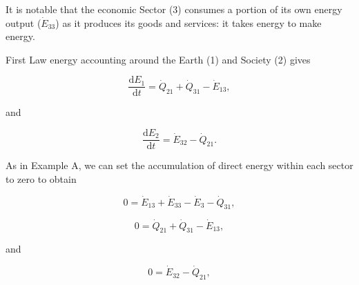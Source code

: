 \documentclass[authoryear,preprint,review,12pt]{elsarticle}
\begin{document}
\noindent It is notable that the economic Sector (3) consumes a portion of its own energy output ($\dot{E}_{33}$) as it produces its goods and services: it takes energy to make energy.

First Law energy accounting around the Earth (1) and Society (2) gives

\begin{equation} \label{eq:CV_E_dot_1}
	\frac{\mathrm{d}E_{1}}{\mathrm{d}t} 	 =  \dot{Q}_{21} + \dot{Q}_{31} - \dot{E}_{13},
\end{equation}

\noindent and 

\begin{equation} \label{eq:CV_E_dot_2}
	\frac{\mathrm{d}E_{2}}{\mathrm{d}t} 	 = \dot{E}_{32} - \dot{Q}_{21}.
\end{equation}

As in Example A, we can set the accumulation of direct energy within each sector to zero to obtain

\begin{equation} \label{eq:CV_E_dot_3_SS}
	0 =\dot{E}_{13} + \dot{E}_{33} - \dot{E}_{3} - \dot{Q}_{31},
\end{equation}

\begin{equation} \label{eq:CV_E_dot_1_SS}
	0 =  \dot{Q}_{21} + \dot{Q}_{31} - \dot{E}_{13},
\end{equation}

\noindent and 

\begin{equation} \label{eq:CV_E_dot_2_SS}
	0 =\dot{E}_{32} - \dot{Q}_{21},
\end{equation}

%
%
%
%
%
%
\end{document}
